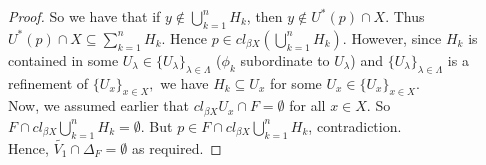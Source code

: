\documentclass{amsart}
\begin{document}
\begin{proof}
So we have that if $y \notin \bigcup_{k=1}^{n} H_k$, then $y\notin U^*(p)\cap X.$ Thus $U^*(p)\cap X \subseteq \sum_{k=1}^{n} H_k.$ Hence $p\in cl_{\beta X} (\bigcup_{k=1}^{n} H_k).$ However, since $H_k$ is contained in some $U_\lambda \in \{U_\lambda\}_{\lambda \in \Lambda}$ ($\phi_k$ subordinate to $U_\lambda$) and $\{U_\lambda\}_{\lambda \in \Lambda}$ is a refinement of $\{U_x\}_{x\in X},$ we have $H_k \subseteq U_x$ for some $U_x \in \{U_x\}_{x \in X}.$\\
Now, we assumed earlier that $cl_{\beta X} U_x \cap F = \emptyset$ for all $x\in X$. So $F\cap cl_{\beta X} \bigcup_{k=1}^{n} H_k = \emptyset.$ But $p \in F\cap cl_{\beta X} \bigcup_{k=1}^{n} H_k$, contradiction. \\
Hence, $\tilde{V_1}\cap \Delta_F = \emptyset$ as required. 





\end{proof}
\end{document}
